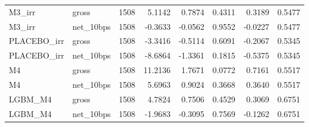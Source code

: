 \begin{tabular}{llrrrrrr}
M3\_irr & gross & 1508 & 5.1142 & 0.7874 & 0.4311 & 0.3189 & 0.5477 \\
M3\_irr & net\_10bps & 1508 & -0.3633 & -0.0562 & 0.9552 & -0.0227 & 0.5477 \\
PLACEBO\_irr & gross & 1508 & -3.3416 & -0.5114 & 0.6091 & -0.2067 & 0.5345 \\
PLACEBO\_irr & net\_10bps & 1508 & -8.6864 & -1.3361 & 0.1815 & -0.5375 & 0.5345 \\
M4 & gross & 1508 & 11.2136 & 1.7671 & 0.0772 & 0.7161 & 0.5517 \\
M4 & net\_10bps & 1508 & 5.6963 & 0.9024 & 0.3668 & 0.3640 & 0.5517 \\
LGBM\_M4 & gross & 1508 & 4.7824 & 0.7506 & 0.4529 & 0.3069 & 0.6751 \\
LGBM\_M4 & net\_10bps & 1508 & -1.9683 & -0.3095 & 0.7569 & -0.1262 & 0.6751 \\
\bottomrule
\end{tabular}

